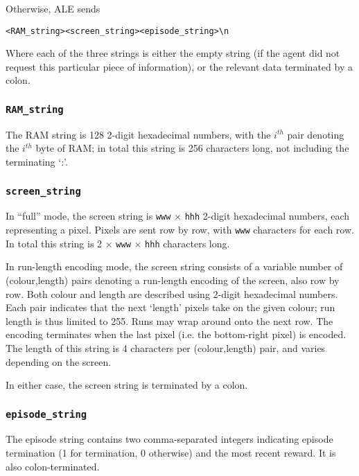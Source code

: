 \documentclass[12pt]{article}
\begin{document}
Otherwise, ALE sends

\begin{verbatim}
<RAM_string><screen_string><episode_string>\n
\end{verbatim}

Where each of the three strings is either the empty string (if the agent did not request this
particular piece of information), or the relevant data terminated by a colon.

\subsubsection{\texttt{RAM\_string}}

The RAM string is 128 2-digit hexadecimal numbers, with the $i^{th}$ pair denoting the
$i^{th}$ byte of RAM; in total this string is 256 characters long, not including the terminating
`:'.

\subsubsection{\texttt{screen\_string}}

In ``full'' mode, the screen string is \texttt{www} $\times$ \texttt{hhh} 2-digit hexadecimal numbers, each representing a pixel. Pixels are sent row by row, with \texttt{www} characters for each row. In total this string is 2 $\times$ \texttt{www} $\times$ \texttt{hhh} characters long.

In run-length encoding mode, the screen string consists of a variable number of (colour,length) pairs denoting a run-length encoding of the screen, also row by row. Both colour and length are described using 2-digit hexadecimal numbers. Each pair indicates that the next `length' pixels take on the given colour; run length is thus limited to 255. Runs may wrap around onto the next row. The encoding terminates when the last pixel (i.e. the bottom-right pixel) is encoded. The length of this string is 4 characters per (colour,length) pair, and varies depending on the screen.

In either case, the screen string is terminated by a colon.

\subsubsection{\texttt{episode\_string}}

The episode string contains two comma-separated integers indicating episode termination (1 for
termination, 0 otherwise) and the most recent reward. It is also colon-terminated.
\end{document}
